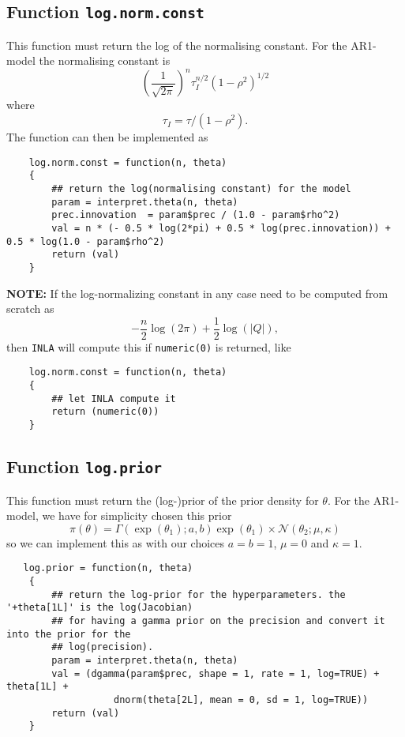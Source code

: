 \documentclass[a4paper,11pt]{article}
\begin{document}
\subsection*{Function \texttt{log.norm.const}}

This function must return the log of the normalising constant. For the
AR1-model the normalising constant is
\begin{displaymath}
    \left(\frac{1}{\sqrt{2\pi}}\right)^{n} \tau_{I}^{n/2} (1-\rho^{2})^{1/2}
\end{displaymath}
where
\begin{displaymath}
    \tau_{I} = \tau/(1-\rho^{2}).
\end{displaymath}
The function can then be implemented as
{\small
\begin{verbatim}
    log.norm.const = function(n, theta)
    {
        ## return the log(normalising constant) for the model
        param = interpret.theta(n, theta)
        prec.innovation  = param$prec / (1.0 - param$rho^2)
        val = n * (- 0.5 * log(2*pi) + 0.5 * log(prec.innovation)) + 0.5 * log(1.0 - param$rho^2)
        return (val)
    }
\end{verbatim}
}
\noindent
\textbf{NOTE:} If the log-normalizing constant in any case need to be
computed from scratch as $$-\frac{n}{2}\log(2\pi) +
\frac{1}{2} \log(|{Q}|),$$ then \texttt{INLA} will compute this if
\texttt{numeric(0)} is returned, like {\small
\begin{verbatim}
    log.norm.const = function(n, theta)
    {
        ## let INLA compute it
        return (numeric(0))
    }
\end{verbatim}
}


\subsection*{Function \texttt{log.prior}}

This function must return the (log-)prior of the prior density for
$\theta$. For the AR1-model, we have for simplicity chosen this prior
\begin{displaymath}
    \pi(\theta) = \Gamma(\exp(\theta_1); a,b) \exp(\theta_1) \times
    {\mathcal N}(\theta_{2}; \mu, \kappa)
\end{displaymath}
so we can implement this as with our choices $a=b=1$, $\mu=0$ and
$\kappa=1$. 
{\small
\begin{verbatim}
   log.prior = function(n, theta)
    {
        ## return the log-prior for the hyperparameters. the '+theta[1L]' is the log(Jacobian)
        ## for having a gamma prior on the precision and convert it into the prior for the
        ## log(precision).
        param = interpret.theta(n, theta)
        val = (dgamma(param$prec, shape = 1, rate = 1, log=TRUE) + theta[1L] + 
                   dnorm(theta[2L], mean = 0, sd = 1, log=TRUE))
        return (val)
    }
\end{verbatim}
}
\end{document}
